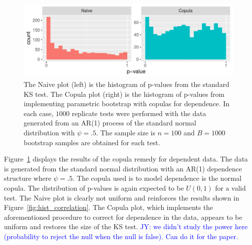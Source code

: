 \documentclass[12pt, letterpaper, titlepage]{article}
\newcommand{\jy}[1]{\textcolor{blue}{JY: #1}}
\begin{document}
\begin{figure}[tbp]
  \centering
  \includegraphics[width=\textwidth]{hist_ar1_D}
  \caption{The Naive plot (left) is the histogram of p-values from the 
  standard KS test. The Copula plot (right) is the histogram of p-values from 
  implementing parametric bootstrap with copulas for dependence. In each case, 
  $1000$ replicate tests were performed with the data generated from an AR(1) 
  process of the standard normal distribution with $\psi = .5$. The sample size 
  is $n = 100$ and $B = 1000$ bootstrap samples are obtained for each test.}
  \label{fig:hist_ar1_D}
\end{figure}

Figure~\ref{fig:hist_ar1_D} displays the results of the copula remedy for 
dependent data. The data is generated from the standard normal distribution with
an AR(1) dependence structure where $\psi = .5$. The copula used is to model 
dependence is the normal copula. The distribution of p-values is again expected
to be $U(0, 1)$ for a valid test. The Naive plot is clearly not uniform and 
reinforces the results shown in Figure~\ref{fig:hist_correlation}. The Copula 
plot, which implements the aforementioned procedure to correct for dependence
in the data, appears to be uniform and restores the size of the KS test.
\jy{we didn't study the power here (probability to reject the null when the null
  is false). Can do it for the paper.}
\end{document}
